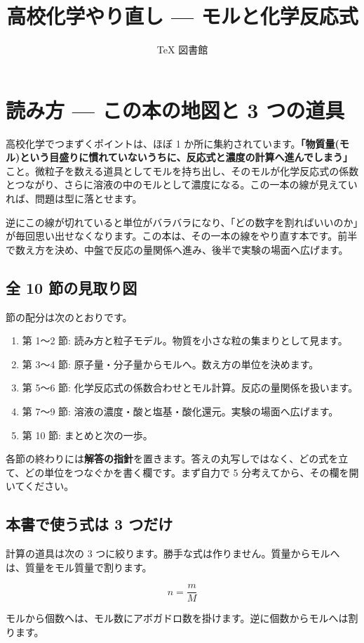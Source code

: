 \documentclass{article}
\title{高校化学やり直し — モルと化学反応式}
\author{TeX 図書館}
\begin{document}
\section{読み方 — この本の地図と 3 つの道具}

高校化学でつまずくポイントは、ほぼ 1 か所に集約されています。\textbf{「物質量(モル)という目盛りに慣れていないうちに、反応式と濃度の計算へ進んでしまう」}こと。微粒子を数える道具としてモルを持ち出し、そのモルが化学反応式の係数とつながり、さらに溶液の中のモルとして濃度になる。この一本の線が見えていれば、問題は型に落とせます。

逆にこの線が切れていると単位がバラバラになり、「どの数字を割ればいいのか」が毎回思い出せなくなります。この本は、その一本の線をやり直す本です。前半で数え方を決め、中盤で反応の量関係へ進み、後半で実験の場面へ広げます。

\subsection{全 10 節の見取り図}

節の配分は次のとおりです。

\begin{enumerate}
\item 第 1〜2 節: 読み方と粒子モデル。物質を小さな粒の集まりとして見ます。
\item 第 3〜4 節: 原子量・分子量からモルへ。数え方の単位を決めます。
\item 第 5〜6 節: 化学反応式の係数合わせとモル計算。反応の量関係を扱います。
\item 第 7〜9 節: 溶液の濃度・酸と塩基・酸化還元。実験の場面へ広げます。
\item 第 10 節: まとめと次の一歩。
\end{enumerate}

各節の終わりには\textbf{解答の指針}を置きます。答えの丸写しではなく、どの式を立て、どの単位をつなぐかを書く欄です。まず自力で 5 分考えてから、その欄を開いてください。

\subsection{本書で使う式は 3 つだけ}

計算の道具は次の 3 つに絞ります。勝手な式は作りません。質量からモルへは、質量をモル質量で割ります。

\[ n = \frac{m}{M} \]

モルから個数へは、モル数にアボガドロ数を掛けます。逆に個数からモルへは割ります。
\end{document}
